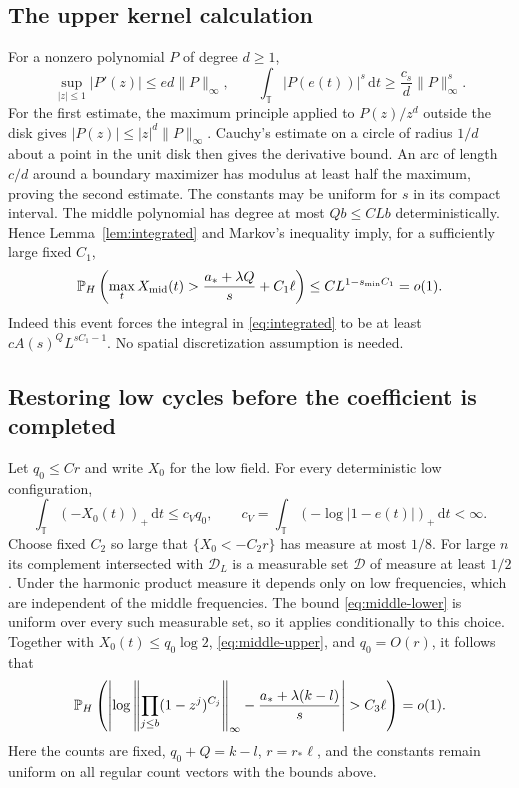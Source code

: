 \documentclass[11pt]{article}
\theoremstyle{definition}\newtheorem{definition}[theorem]{Definition}
\theoremstyle{remark}\newtheorem{remark}[theorem]{Remark}
\newcommand{\T}{\mathbb T}\newcommand{\R}{\mathbb R}\newcommand{\C}{\mathbb C}
\newcommand{\dd}{\,\mathrm d}\newcommand{\ind}{\mathbf1}
\numberwithin{equation}{section}\allowdisplaybreaks
\begin{document}
\subsection{The upper kernel calculation}
For a nonzero polynomial $P$ of degree $d\ge1$,
\begin{equation}\label{eq:poly-estimates}
 \sup_{|z|\le1}|P'(z)|\le ed\|P\|_\infty,\qquad
 \int_\T |P(e(t))|^s\dd t\ge\frac{c_s}{d}\|P\|_\infty^s.
\end{equation}
For the first estimate, the maximum principle applied to $P(z)/z^d$
outside the disk gives $|P(z)|\le|z|^d\|P\|_\infty$. Cauchy's estimate
on a circle of radius $1/d$ about a point in the unit disk then gives the
derivative bound. An arc of length $c/d$ around a boundary maximizer
has modulus at least half the maximum, proving the second estimate.
The constants may be uniform for $s$ in its compact interval.
The middle polynomial has degree at most $Qb\le CLb$ deterministically.
Hence Lemma~\ref{lem:integrated} and Markov's inequality imply, for a
sufficiently large fixed $C_1$,
\begin{equation}\label{eq:middle-upper}
 \mathbb P_H\left(\max_t X_{\rm mid}(t)
       >\frac{a_*+\lambda Q}{s}+C_1\ell\right)
 \le C L^{1-s_{\min}C_1}=o(1).
\end{equation}
Indeed this event forces the integral in \eqref{eq:integrated} to be at
least $cA(s)^Q L^{sC_1-1}$. No spatial discretization assumption is
needed.

\subsection{Restoring low cycles before the coefficient is completed}
Let $q_0\le Cr$ and write $X_0$ for the low field. For every deterministic
low configuration,
\[
 \int_\T(-X_0(t))_+\dd t\le c_Vq_0,\qquad
 c_V=\int_\T(-\log|1-e(t)|)_+\dd t<\infty.
\]
Choose fixed $C_2$ so large that $\{X_0<-C_2r\}$ has measure at most
$1/8$. For large $n$ its complement intersected with $\mathcal D_L$
is a measurable set $\mathcal D$ of measure at least $1/2$.
Under the harmonic product measure it depends only on low frequencies,
which are independent of the middle frequencies. The bound
\eqref{eq:middle-lower} is uniform over every such measurable set, so it
applies conditionally to this choice. Together with
$X_0(t)\le q_0\log2$, \eqref{eq:middle-upper}, and
$q_0=O(r)$, it follows that
\begin{equation}\label{eq:short-H}
 \Pp_H\left(\left|\log\left\|\prod_{j\le b}(1-z^j)^{C_j}\right\|_\infty
             -\frac{a_*+\lambda(k-l)}s\right|>C_3\ell\right)=o(1).
\end{equation}
Here the counts are fixed, $q_0+Q=k-l$, $r=r_*\ell$, and the constants
remain uniform on all regular count vectors with the bounds above.
\end{document}
